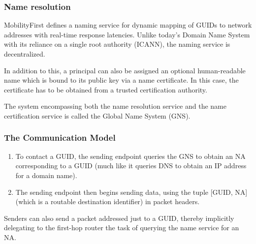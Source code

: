 
            \subsubsection{Name resolution}

                MobilityFirst defines a naming service for dynamic mapping of GUIDs to network addresses with real-time response latencies. Unlike today's Domain Name System with its reliance on a single root authority (ICANN), the naming service is decentralized.

                In addition to this, a principal can also be assigned an optional human-readable name which is bound to its public key via a name certificate. In this case, the certificate has to be obtained from a trusted certification authority.

                The system encompassing both the name resolution service and the name certification service is called the Global Name System (GNS).

            \subsubsection{The Communication Model}

                \begin{enumerate}
                    \item To contact a GUID, the sending endpoint queries the GNS to obtain an NA corresponding to a GUID (much like it queries DNS to obtain an IP address for a domain name).
                    \item The sending endpoint then begins sending data, using the tuple [GUID, NA] (which is a routable destination identifier) in packet headers.
                \end{enumerate}

                Senders can also send a packet addressed just to a GUID, thereby implicitly delegating to the first-hop router the task of querying the name service for an NA.

